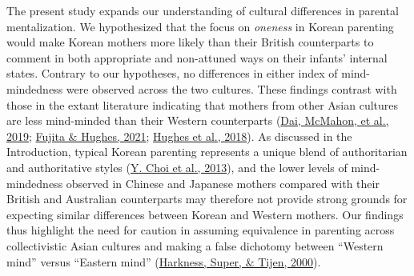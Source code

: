 \documentclass[
]{article}
\begin{document}
The present study expands our understanding of cultural differences in parental mentalization. We hypothesized that the focus on \emph{oneness} in Korean parenting would make Korean mothers more likely than their British counterparts to comment in both appropriate and non-attuned ways on their infants' internal states. Contrary to our hypotheses, no differences in either index of mind-mindedness were observed across the two cultures. These findings contrast with those in the extant literature indicating that mothers from other Asian cultures are less mind-minded than their Western counterparts (\protect\hyperlink{ref-Dai2019b}{Dai, McMahon, et al., 2019}; \protect\hyperlink{ref-Fujita2021}{Fujita \& Hughes, 2021}; \protect\hyperlink{ref-Hughes2018}{Hughes et al., 2018}). As discussed in the Introduction, typical Korean parenting represents a unique blend of authoritarian and authoritative styles (\protect\hyperlink{ref-Choi2013}{Y. Choi et al., 2013}), and the lower levels of mind-mindedness observed in Chinese and Japanese mothers compared with their British and Australian counterparts may therefore not provide strong grounds for expecting similar differences between Korean and Western mothers. Our findings thus highlight the need for caution in assuming equivalence in parenting across collectivistic Asian cultures and making a false dichotomy between ``Western mind'' versus ``Eastern mind'' (\protect\hyperlink{ref-Harkness2000}{Harkness, Super, \& Tijen, 2000}).
\end{document}
